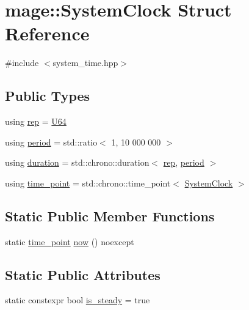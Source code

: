 \hypertarget{structmage_1_1_system_clock}{}\section{mage\+:\+:System\+Clock Struct Reference}
\label{structmage_1_1_system_clock}


{\ttfamily \#include $<$system\+\_\+time.\+hpp$>$}

\subsection*{Public Types}
\begin{DoxyCompactItemize}
\item 
using \hyperlink{structmage_1_1_system_clock_a79624f5c1fee7b66340e17c55de581bc}{rep} = \hyperlink{namespacemage_a6672cf3c861707ce4a3235a3eb43941d}{U64}
\item 
using \hyperlink{structmage_1_1_system_clock_abeec02cf8004e47bf85ae3a7fe421f37}{period} = std\+::ratio$<$ 1, 10 \textquotesingle{}000 \textquotesingle{}000 $>$
\item 
using \hyperlink{structmage_1_1_system_clock_a88a771bf7e8fa13ab4e5e712f8d8794b}{duration} = std\+::chrono\+::duration$<$ \hyperlink{structmage_1_1_system_clock_a79624f5c1fee7b66340e17c55de581bc}{rep}, \hyperlink{structmage_1_1_system_clock_abeec02cf8004e47bf85ae3a7fe421f37}{period} $>$
\item 
using \hyperlink{structmage_1_1_system_clock_a00c052d5e1349785a6847fbfb9e1f044}{time\+\_\+point} = std\+::chrono\+::time\+\_\+point$<$ \hyperlink{structmage_1_1_system_clock}{System\+Clock} $>$
\end{DoxyCompactItemize}
\subsection*{Static Public Member Functions}
\begin{DoxyCompactItemize}
\item 
static \hyperlink{structmage_1_1_system_clock_a00c052d5e1349785a6847fbfb9e1f044}{time\+\_\+point} \hyperlink{structmage_1_1_system_clock_a4e4ef603bf70620810aa205b1eb89bc6}{now} () noexcept
\end{DoxyCompactItemize}
\subsection*{Static Public Attributes}
\begin{DoxyCompactItemize}
\item 
static constexpr bool \hyperlink{structmage_1_1_system_clock_ad7cdec95a6032ab973ed02da26ddd3f0}{is\+\_\+steady} = true
\end{DoxyCompactItemize}


